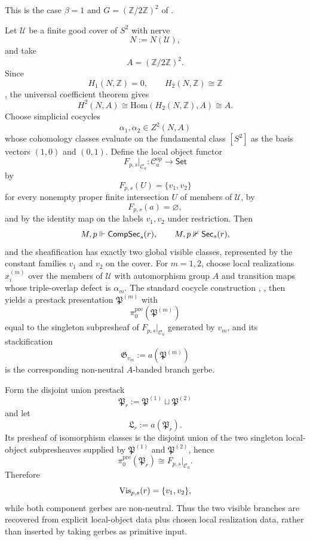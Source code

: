 \begin{example}\label{ex:two-branch-sphere-separation}
This is the case $\beta=1$ and $G=(\mathbb Z/2\mathbb Z)^2$ of .

Let $\mathcal U$ be a finite good cover of $S^2$ with nerve
\[
N:=N(\mathcal U),
\]
and take
\[
A=(\mathbb Z/2\mathbb Z)^2.
\]
Since
\[
H_1(N,\mathbb Z)=0,
\qquad
H_2(N,\mathbb Z)\cong \mathbb Z
\]
\cite[Secs.~2.1, 2.2]{Hatcher2002}, the universal coefficient theorem gives
\[
H^2(N,A)\cong \mathrm{Hom}(H_2(N,\mathbb Z),A)\cong A.
\]
Choose simplicial cocycles
\[
\alpha_1,\alpha_2\in Z^2(N,A)
\]
whose cohomology classes evaluate on the fundamental class $[S^2]$ as the basis vectors $(1,0)$ and $(0,1)$. Define the local object functor
\[
F_{p,s}|_{\mathcal C_a}:\mathcal C_a^{op}\to\mathsf{Set}
\]
by
\[
F_{p,s}(U)=\{v_1,v_2\}
\]
for every nonempty proper finite intersection $U$ of members of $\mathcal U$, by
\[
F_{p,s}(a)=\varnothing,
\]
and by the identity map on the labels $v_1,v_2$ under restriction. Then
\[
M,p\Vdash \mathsf{CompSec}_s(r),
\qquad
M,p\nVdash \mathsf{Sec}_s(r),
\]
and the sheafification has exactly two global visible classes, represented by the constant families $v_1$ and $v_2$ on the cover. For $m=1,2$, choose local realizations $x_i^{(m)}$ over the members of $\mathcal U$ with automorphism group $A$ and transition maps whose triple-overlap defect is $\alpha_m$. The standard cocycle construction \cite[Chap.~IV]{Giraud1971}, \cite[Sec.~5]{Breen2006}, \cite{Murray1996} then yields a prestack presentation $\mathfrak P^{(m)}$ with
\[
\pi_0^{\mathrm{pre}}(\mathfrak P^{(m)})
\]
equal to the singleton subpresheaf of $F_{p,s}|_{\mathcal C_a}$ generated by $v_m$, and its stackification
\[
\mathfrak G_{v_m}:=a(\mathfrak P^{(m)})
\]
is the corresponding non-neutral $A$-banded branch gerbe.

Form the disjoint union prestack
\[
\mathfrak P_r:=\mathfrak P^{(1)}\sqcup \mathfrak P^{(2)}
\]
and let
\[
\mathfrak L_r:=a(\mathfrak P_r).
\]
Its presheaf of isomorphism classes is the disjoint union of the two singleton local-object subpresheaves supplied by $\mathfrak P^{(1)}$ and $\mathfrak P^{(2)}$, hence
\[
\pi_0^{\mathrm{pre}}(\mathfrak P_r)\cong F_{p,s}|_{\mathcal C_a}.
\]
Therefore
\[
\mathrm{Vis}_{p,s}(r)=\{v_1,v_2\},
\]
while both component gerbes are non-neutral. Thus the two visible branches are recovered from explicit local-object data plus chosen local realization data, rather than inserted by taking gerbes as primitive input.


\end{example}
